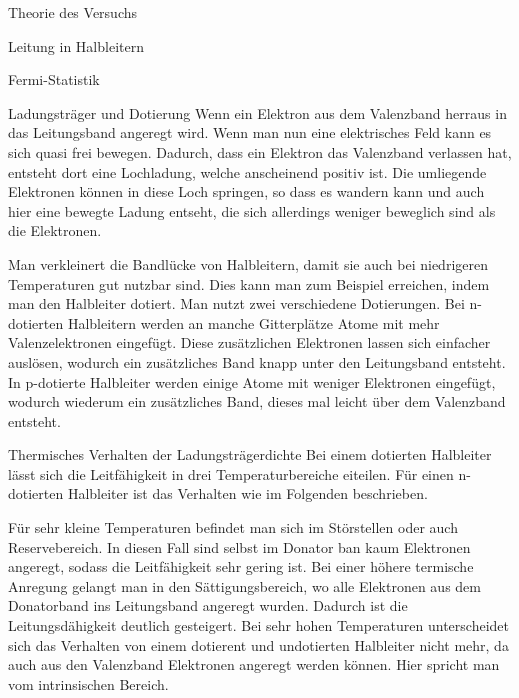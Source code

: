 \documentclass[pdftex, a4paper,11pt, twoside, ngerman]{report}
\begin{document}
\begin{chapter}{Theorie des Versuchs}
\begin{section}{Leitung in Halbleitern}
\begin{subsection}{Fermi-Statistik}
        \end{subsection}

        \begin{subsection}{Ladungsträger und Dotierung}
            Wenn ein Elektron aus dem Valenzband herraus in das Leitungsband angeregt wird.
            Wenn man nun eine elektrisches Feld kann es sich quasi frei bewegen.
            Dadurch, dass ein Elektron das Valenzband verlassen hat, entsteht dort eine Lochladung, welche anscheinend positiv ist. 
            Die umliegende Elektronen können in diese Loch springen, so dass es wandern kann und auch hier eine bewegte Ladung entseht, die sich allerdings weniger beweglich sind als die Elektronen.

            Man verkleinert die Bandlücke von Halbleitern, damit sie auch bei niedrigeren Temperaturen gut nutzbar sind.
            Dies kann man zum Beispiel erreichen, indem man den Halbleiter dotiert.
            Man nutzt zwei verschiedene Dotierungen. 
            Bei n-dotierten Halbleitern werden an manche Gitterplätze Atome mit mehr Valenzelektronen eingefügt.
            Diese zusätzlichen Elektronen lassen sich einfacher auslösen, wodurch ein zusätzliches Band knapp unter den Leitungsband entsteht.
            In p-dotierte Halbleiter werden einige Atome mit weniger Elektronen eingefügt, wodurch wiederum ein zusätzliches Band, dieses mal leicht über dem Valenzband entsteht.

        \end{subsection}

        \begin{subsection}{Thermisches Verhalten der Ladungsträgerdichte}
            Bei einem dotierten Halbleiter lässt sich die Leitfähigkeit in drei Temperaturbereiche eiteilen.
            Für einen n-dotierten Halbleiter ist das Verhalten wie im Folgenden beschrieben.

            Für sehr kleine Temperaturen befindet man sich im Störstellen oder auch Reservebereich. In diesen Fall sind selbst im Donator ban kaum Elektronen angeregt, sodass die Leitfähigkeit sehr gering ist.
            Bei einer höhere termische Anregung gelangt man in den Sättigungsbereich, wo alle Elektronen aus dem Donatorband ins Leitungsband angeregt wurden.
            Dadurch ist die Leitungsdähigkeit deutlich gesteigert.
            Bei sehr hohen Temperaturen unterscheidet sich das Verhalten von einem dotierent und undotierten Halbleiter nicht mehr, da auch aus den Valenzband Elektronen angeregt werden können.
            Hier spricht man vom intrinsischen Bereich.


\end{subsection}
\end{section}
\end{chapter}
\end{document}

